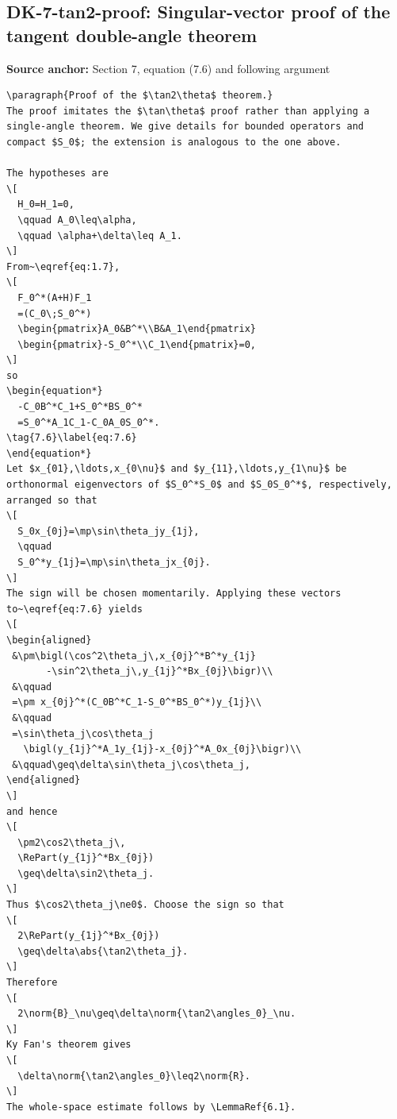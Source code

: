 \subsection*{DK-7-tan2-proof: Singular-vector proof of the tangent double-angle theorem}
\noindent\textbf{Source anchor:} Section 7, equation (7.6) and following argument\\
\begin{verbatim}
\paragraph{Proof of the $\tan2\theta$ theorem.}
The proof imitates the $\tan\theta$ proof rather than applying a single-angle theorem. We give details for bounded operators and compact $S_0$; the extension is analogous to the one above.

The hypotheses are
\[
  H_0=H_1=0,
  \qquad A_0\leq\alpha,
  \qquad \alpha+\delta\leq A_1.
\]
From~\eqref{eq:1.7},
\[
  F_0^*(A+H)F_1
  =(C_0\;S_0^*)
  \begin{pmatrix}A_0&B^*\\B&A_1\end{pmatrix}
  \begin{pmatrix}-S_0^*\\C_1\end{pmatrix}=0,
\]
so
\begin{equation*}
  -C_0B^*C_1+S_0^*BS_0^*
  =S_0^*A_1C_1-C_0A_0S_0^*.
\tag{7.6}\label{eq:7.6}
\end{equation*}
Let $x_{01},\ldots,x_{0\nu}$ and $y_{11},\ldots,y_{1\nu}$ be orthonormal eigenvectors of $S_0^*S_0$ and $S_0S_0^*$, respectively, arranged so that
\[
  S_0x_{0j}=\mp\sin\theta_jy_{1j},
  \qquad
  S_0^*y_{1j}=\mp\sin\theta_jx_{0j}.
\]
The sign will be chosen momentarily. Applying these vectors to~\eqref{eq:7.6} yields
\[
\begin{aligned}
 &\pm\bigl(\cos^2\theta_j\,x_{0j}^*B^*y_{1j}
       -\sin^2\theta_j\,y_{1j}^*Bx_{0j}\bigr)\\
 &\qquad
 =\pm x_{0j}^*(C_0B^*C_1-S_0^*BS_0^*)y_{1j}\\
 &\qquad
 =\sin\theta_j\cos\theta_j
   \bigl(y_{1j}^*A_1y_{1j}-x_{0j}^*A_0x_{0j}\bigr)\\
 &\qquad\geq\delta\sin\theta_j\cos\theta_j,
\end{aligned}
\]
and hence
\[
  \pm2\cos2\theta_j\,
  \RePart(y_{1j}^*Bx_{0j})
  \geq\delta\sin2\theta_j.
\]
Thus $\cos2\theta_j\ne0$. Choose the sign so that
\[
  2\RePart(y_{1j}^*Bx_{0j})
  \geq\delta\abs{\tan2\theta_j}.
\]
Therefore
\[
  2\norm{B}_\nu\geq\delta\norm{\tan2\angles_0}_\nu.
\]
Ky Fan's theorem gives
\[
  \delta\norm{\tan2\angles_0}\leq2\norm{R}.
\]
The whole-space estimate follows by \LemmaRef{6.1}.
\end{verbatim}


